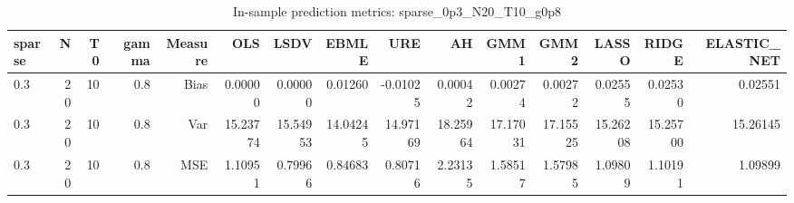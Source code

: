 \begin{table}[!htbp]\centering
\caption{In-sample prediction metrics: sparse_0p3_N20_T10_g0p8}
\label{tab:table2_sparse_0p3_N20_T10_g0p8}
\begin{tabular}{lrrrrrrrrrrrrrr}
\hline
sparse & N & T0 & gamma & Measure & OLS & LSDV & EBMLE & URE & AH & GMM1 & GMM2 & LASSO & RIDGE & ELASTIC_NET \\
\hline
0.3 & 20 & 10 & 0.8 & Bias & 0.00000 & 0.00000 & 0.01260 & -0.01025 & 0.00042 & 0.00274 & 0.00272 & 0.02555 & 0.02530 & 0.02551 \\
0.3 & 20 & 10 & 0.8 & Var & 15.23774 & 15.54953 & 14.04245 & 14.97169 & 18.25964 & 17.17031 & 17.15525 & 15.26208 & 15.25700 & 15.26145 \\
0.3 & 20 & 10 & 0.8 & MSE & 1.10951 & 0.79966 & 0.84683 & 0.80716 & 2.23135 & 1.58517 & 1.57985 & 1.09809 & 1.10191 & 1.09899 \\
\hline
\end{tabular}
\end{table}

